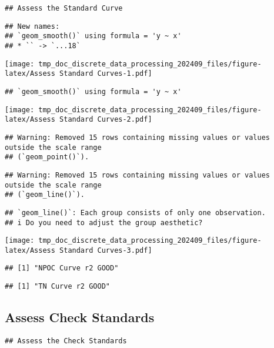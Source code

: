 \documentclass[
]{article}
\begin{document}
\begin{verbatim}
## Assess the Standard Curve
\end{verbatim}

\begin{verbatim}
## New names:
## `geom_smooth()` using formula = 'y ~ x'
## * `` -> `...18`
\end{verbatim}

\texttt{[image: tmp\_doc\_discrete\_data\_processing\_202409\_files/figure-latex/Assess Standard Curves-1.pdf]}

\begin{verbatim}
## `geom_smooth()` using formula = 'y ~ x'
\end{verbatim}

\texttt{[image: tmp\_doc\_discrete\_data\_processing\_202409\_files/figure-latex/Assess Standard Curves-2.pdf]}

\begin{verbatim}
## Warning: Removed 15 rows containing missing values or values outside the scale range
## (`geom_point()`).
\end{verbatim}

\begin{verbatim}
## Warning: Removed 15 rows containing missing values or values outside the scale range
## (`geom_line()`).
\end{verbatim}

\begin{verbatim}
## `geom_line()`: Each group consists of only one observation.
## i Do you need to adjust the group aesthetic?
\end{verbatim}

\texttt{[image: tmp\_doc\_discrete\_data\_processing\_202409\_files/figure-latex/Assess Standard Curves-3.pdf]}

\begin{verbatim}
## [1] "NPOC Curve r2 GOOD"
\end{verbatim}

\begin{verbatim}
## [1] "TN Curve r2 GOOD"
\end{verbatim}

\newpage

\hypertarget{assess-check-standards}{%
\subsection{Assess Check Standards}\label{assess-check-standards}}

\begin{verbatim}
## Assess the Check Standards
\end{verbatim}
\end{document}
